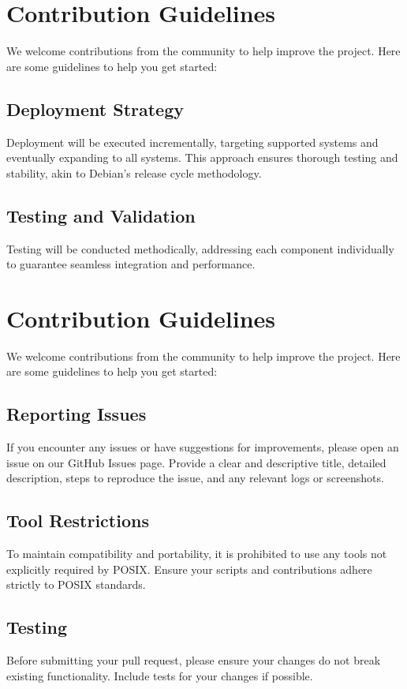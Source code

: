 \section{Contribution Guidelines}
We welcome contributions from the community to help improve the project. Here are some guidelines to help you get started:

\subsection{Deployment Strategy}

Deployment will be executed incrementally, targeting supported systems and eventually expanding to all systems. This approach ensures thorough testing and stability, akin to Debian's release cycle methodology.

\subsection{Testing and Validation}

Testing will be conducted methodically, addressing each component individually to guarantee seamless integration and performance.

\section{Contribution Guidelines}

We welcome contributions from the community to help improve the project. Here are some guidelines to help you get started:

\subsection{Reporting Issues}
If you encounter any issues or have suggestions for improvements, please open an issue on our GitHub Issues page. Provide a clear and descriptive title, detailed description, steps to reproduce the issue, and any relevant logs or screenshots.

\subsection{Tool Restrictions}
To maintain compatibility and portability, it is prohibited to use any tools not explicitly required by POSIX. Ensure your scripts and contributions adhere strictly to POSIX standards.

\subsection{Testing}
Before submitting your pull request, please ensure your changes do not break existing functionality. Include tests for your changes if possible.

